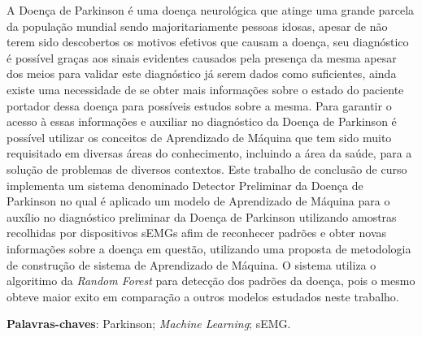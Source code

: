 \begin{resumo}
    A Doença de Parkinson é uma doença neurológica que atinge uma grande parcela da população mundial sendo majoritariamente pessoas idosas, apesar de não terem sido descobertos os motivos efetivos que causam a doença, seu diagnóstico é possível graças aos sinais evidentes causados pela presença da mesma apesar dos meios para validar este diagnóstico já serem dados como suficientes, ainda existe uma necessidade de se obter mais informações sobre o estado do paciente portador dessa doença para possíveis estudos sobre a mesma. Para garantir o acesso à essas informações e auxiliar no diagnóstico da Doença de Parkinson é possível utilizar os conceitos de Aprendizado de Máquina que tem sido muito requisitado em diversas áreas do conhecimento, incluindo a área da saúde, para a solução de problemas de diversos contextos. Este trabalho de conclusão de curso implementa um sistema denominado Detector Preliminar da Doença de Parkinson no qual é aplicado um modelo de Aprendizado de Máquina para o auxílio no diagnóstico preliminar da Doença de Parkinson utilizando amostras recolhidas por dispositivos sEMGs afim de reconhecer padrões e obter novas informações sobre a doença em questão, utilizando uma proposta de metodologia de construção de sistema de Aprendizado de Máquina. O sistema utiliza o algoritimo da \textit{Random Forest} para detecção dos padrões da doença, pois o mesmo obteve maior exito em comparação a outros modelos estudados neste trabalho.

 \vspace{\onelineskip}
    
 \noindent
 \textbf{Palavras-chaves}: Parkinson; \textit{Machine Learning}; sEMG.
\end{resumo}
